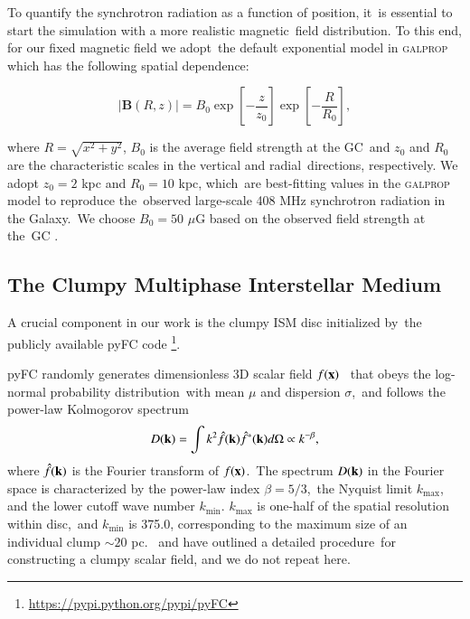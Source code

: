 \documentclass[twocolumn]{aastex631}
\begin{document}
  To quantify the synchrotron radiation as a function of position, it\
  is essential to start the simulation with a more realistic magnetic\
  field distribution. To this end, for our fixed magnetic field we adopt\
  the default exponential model in \textsc{galprop} \citep{Strong2007}
  which has the following spatial dependence:\

  \begin{equation}
     |\mathbf{B}(R, z)|=B_{0}\exp\left[-\frac{z}{z_{0}}\right]\exp\left[-\frac{R}{R_{0}}\right],
     \label{magnetic-field}
  \end{equation}


  where $R=\sqrt{x^{2}+y^{2}}$, $B_{0}$ is the average field strength at the GC\
  and $z_{0}$ and $R_{0}$ are the characteristic scales in the vertical and radial\
  directions, respectively. We adopt $z_{0} = 2$ kpc and $R_{0} = 10$ kpc, which\
  are best-fitting values in the \textsc{galprop} model to reproduce the\
  observed large-scale 408 MHz synchrotron radiation in the Galaxy.\
  We choose $B_{0} = 50$ $\mu$G based on the observed field strength at the\
  GC \citep{Crocker2010}.



  \subsection{The Clumpy Multiphase Interstellar Medium}

  A crucial component in our work is the clumpy ISM disc initialized by\
  the publicly available pyFC code
  \footnote{\url{https://pypi.python.org/pypi/pyFC}}.\

  pyFC randomly generates dimensionless 3D scalar field $f(\bold{x})$\ %
  that obeys the log-normal probability distribution\
  with mean $\mu$ and dispersion $\sigma$,\
  and follows the power-law Kolmogorov spectrum
  \begin{equation}
    D(\bold{k})=\int k^{2} \hat{f}(\bold{k})\hat{f}^{*}(\bold{k})d\Omega \propto k^{-\beta},
    \label{Kolmogorov-spectrum}
  \end{equation}
  where $\hat{f}(\bold{k})$ is the Fourier transform of $f(\bold{x})$.\
  The spectrum $D(\bold{k})$ in the Fourier space is characterized by the power-law index $\beta=5/3$,\
  the Nyquist limit $k_{\text{max}}$, and the lower cutoff wave number $k_{\text{min}}$.
  $k_{\text{max}}$ is one-half of the spatial resolution within disc,\
  and $k_{\text{min}}$ is 375.0, corresponding to the maximum size of an individual clump $\sim 20$ pc.\
  \citet{LA2002} and \citet{Wagner2012} have outlined a detailed procedure\
  for constructing a clumpy scalar field, and we do not repeat here.
\end{document}
